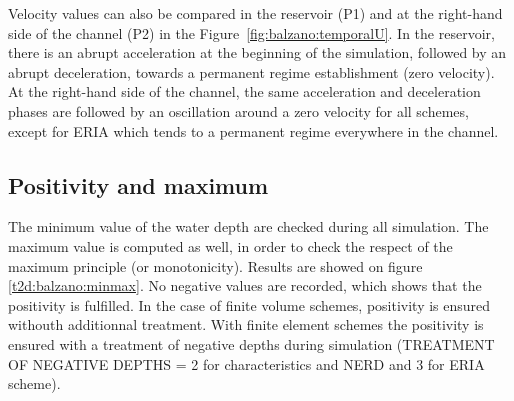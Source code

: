 Velocity values can also be compared in the reservoir (P1) and at the right-hand side of the channel (P2) in the Figure~\ref{fig:balzano:temporalU}.
In the reservoir, there is an abrupt acceleration at the beginning of the simulation, followed by an
abrupt deceleration, towards a permanent regime establishment (zero velocity).
At the right-hand side of the channel, the same acceleration and deceleration
phases are followed by an oscillation around a zero velocity for all schemes,
except for ERIA which tends to a permanent regime everywhere in the channel.




\subsection{Positivity and maximum}

The minimum value of the water depth are checked during all simulation. 
The maximum value is computed as well, in order to check the respect of the maximum principle (or monotonicity). 
Results are showed on figure \ref{t2d:balzano:minmax}. 
No negative values are recorded, which shows that the positivity is fulfilled.
In the case of finite volume schemes, positivity is ensured withouth additionnal treatment.
With finite element schemes the positivity is ensured with a treatment of negative depths
during simulation (TREATMENT OF NEGATIVE DEPTHS = 2 for characteristics and NERD and 3 for ERIA scheme).

